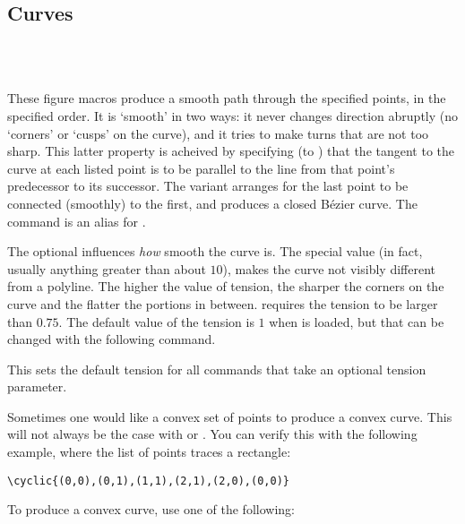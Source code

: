 \documentclass[letterpaper]{article}
\begin{document}
\subsection{Curves}\label{curves}

\begin{cd}
\\
\\
%
%
%
\end{cd}

These figure macros produce a smooth path through the specified points,
in the specified order. It is `smooth' in two ways: it never changes
direction abruptly (no `corners' or `cusps' on the curve), and it tries
to make turns that are not too sharp. This latter property is acheived
by specifying (to \MF{}) that the tangent to the curve at each listed
point is to be parallel to the line from that point's predecessor to its
successor. The  variant arranges for the last point to be
connected (smoothly) to the first, and produces a closed \MF{} B\'ezier
curve. The command  is an alias for .

The optional  influences \emph{how} smooth the curve is.
The special value  (in fact, usually anything greater than
about $10$), makes the curve not visibly different from a polyline. The
higher the value of tension, the sharper the corners on the curve and
the flatter the portions in between. \CMF{} requires the tension to be
larger than $0.75$. The default value of the tension is $1$ when \mfp{} is
loaded, but that can be changed with the following command.

\begin{cd}
%
\end{cd}

This sets the default tension for all commands that take an optional
tension parameter.

\medskip
Sometimes one would like a convex set of points to produce a convex
curve. This will not always be the case with  or .
You can verify this with the following example, where the list of points
traces a rectangle:
\begin{verbatim}
\cyclic{(0,0),(0,1),(1,1),(2,1),(2,0),(0,0)}
\end{verbatim}
To produce a convex curve, use one of the following:
\end{document}
